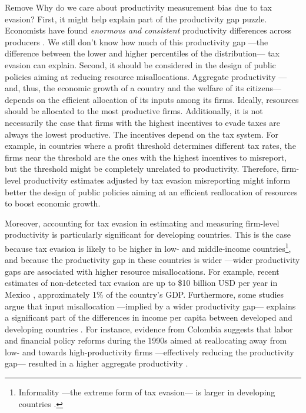 \documentclass[
  12pt]{article}
\begin{document}
\begin{anfxnote}{Remove}
Why do we care about productivity measurement bias due to tax evasion?
First, it might help explain part of the productivity gap puzzle.
Economists have found \emph{enormous and consistent} productivity
differences across producers \citep{Syverson2011}. We still don't know
how much of this productivity gap ---the difference between the lower
and higher percentiles of the distribution--- tax evasion can explain.
Second, it should be considered in the design of public policies aiming
at reducing resource misallocations. Aggregate productivity ---and,
thus, the economic growth of a country and the welfare of its
citizens--- depends on the efficient allocation of its inputs among its
firms. Ideally, resources should be allocated to the most productive
firms. Additionally, it is not necessarily the case that firms with the
highest incentives to evade taxes are always the lowest productive. The
incentives depend on the tax system. For example, in countries where a
profit threshold determines different tax rates, the firms near the
threshold are the ones with the highest incentives to misreport, but the
threshold might be completely unrelated to productivity. Therefore,
firm-level productivity estimates adjusted by tax evasion misreporting
might inform better the design of public policies aiming at an efficient
reallocation of resources to boost economic growth.

Moreover, accounting for tax evasion in estimating and measuring
firm-level productivity is particularly significant for developing
countries. This is the case because tax evasion is likely to be higher
in low- and middle-income countries\footnote{Informality ---the extreme
  form of tax evasion--- is larger in developing countries
  \citep{Loayza2006, LaPorta2014}.}, and because the productivity gap in
these countries is wider ---wider productivity gaps are associated with
higher resource misallocations. For example, recent estimates of
non-detected tax evasion are up to \$10 billion USD per year in Mexico
\citep{Zumaya2021}, approximately 1\% of the country's GDP. Furthermore,
some studies argue that input misallocation ---implied by a wider
productivity gap--- explains a significant part of the differences in
income per capita between developed and developing countries
\citep{Syverson2011, Levy2018}. For instance, evidence from Colombia
suggests that labor and financial policy reforms during the 1990s aimed
at reallocating away from low- and towards high-productivity firms
---effectively reducing the productivity gap--- resulted in a higher
aggregate productivity \citep{Eslava2004}.


\end{anfxnote}
\end{document}
